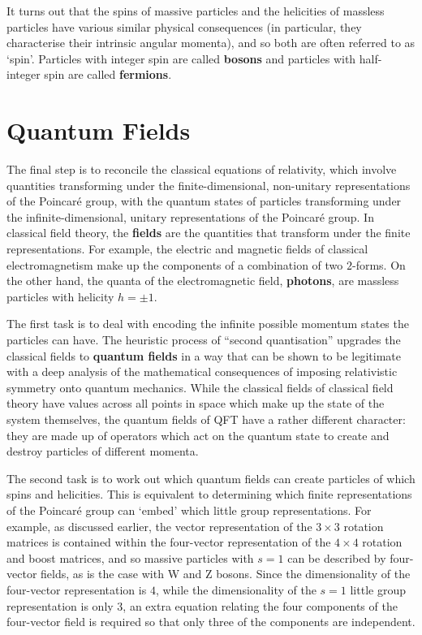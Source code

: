 \documentclass[12pt]{article}
\begin{document}
It turns out that the spins of massive particles and the helicities of massless particles have various similar physical consequences (in particular, they characterise their intrinsic angular momenta), and so both are often referred to as `spin'. Particles with integer spin are called \textbf{bosons} and particles with half-integer spin are called \textbf{fermions}.

\section{Quantum Fields}

The final step is to reconcile the classical equations of relativity, which involve quantities transforming under the finite-dimensional, non-unitary representations of the Poincaré group, with the quantum states of particles transforming under the infinite-dimensional, unitary representations of the Poincaré group. In classical field theory, the \textbf{fields} are the quantities that transform under the finite representations. For example, the electric and magnetic fields of classical electromagnetism make up the components of a combination of two $2$-forms. On the other hand, the quanta of the electromagnetic field, \textbf{photons}, are massless particles with helicity $h = \pm 1$.
\newline

The first task is to deal with encoding the infinite possible momentum states the particles can have. The heuristic process of ``second quantisation'' upgrades the classical fields to \textbf{quantum fields} in a way that can be shown to be legitimate with a deep analysis of the mathematical consequences of imposing relativistic symmetry onto quantum mechanics. While the classical fields of classical field theory have values across all points in space which make up the state of the system themselves, the quantum fields of QFT have a rather different character: they are made up of operators which act on the quantum state to create and destroy particles of different momenta.
\newline

The second task is to work out which quantum fields can create particles of which spins and helicities. This is equivalent to determining which finite representations of the Poincaré group can `embed' which little group representations. For example, as discussed earlier, the vector representation of the $3 \times 3$ rotation matrices is contained within the four-vector representation of the $4 \times 4$ rotation and boost matrices, and so massive particles with $s=1$ can be described by four-vector fields, as is the case with W and Z bosons. Since the dimensionality of the four-vector representation is $4$, while the dimensionality of the $s=1$ little group representation is only $3$, an extra equation relating the four components of the four-vector field is required so that only three of the components are independent.
\newline
\end{document}
